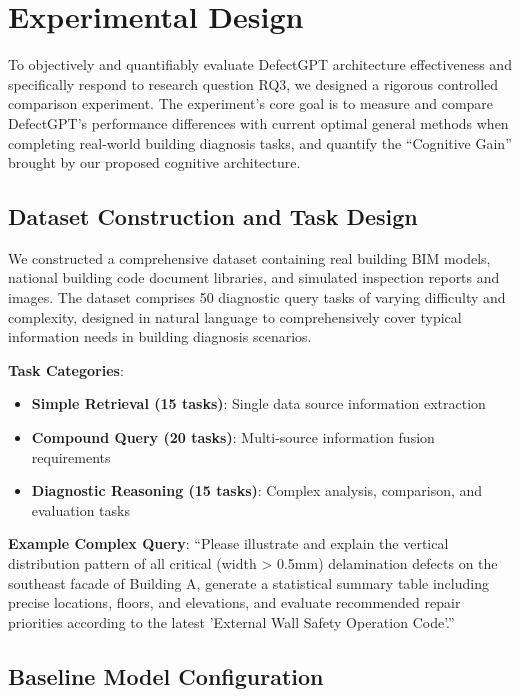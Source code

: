 \section{Experimental Design}

To objectively and quantifiably evaluate DefectGPT architecture effectiveness and specifically respond to research question RQ3, we designed a rigorous controlled comparison experiment. The experiment's core goal is to measure and compare DefectGPT's performance differences with current optimal general methods when completing real-world building diagnosis tasks, and quantify the ``Cognitive Gain'' brought by our proposed cognitive architecture.

\subsection{Dataset Construction and Task Design}

We constructed a comprehensive dataset containing real building BIM models, national building code document libraries, and simulated inspection reports and images. The dataset comprises 50 diagnostic query tasks of varying difficulty and complexity, designed in natural language to comprehensively cover typical information needs in building diagnosis scenarios.

\textbf{Task Categories}:
\begin{itemize}
\item \textbf{Simple Retrieval (15 tasks)}: Single data source information extraction
\item \textbf{Compound Query (20 tasks)}: Multi-source information fusion requirements
\item \textbf{Diagnostic Reasoning (15 tasks)}: Complex analysis, comparison, and evaluation tasks
\end{itemize}

\textbf{Example Complex Query}: ``Please illustrate and explain the vertical distribution pattern of all critical (width > 0.5mm) delamination defects on the southeast facade of Building A, generate a statistical summary table including precise locations, floors, and elevations, and evaluate recommended repair priorities according to the latest 'External Wall Safety Operation Code'.''

\subsection{Baseline Model Configuration}

